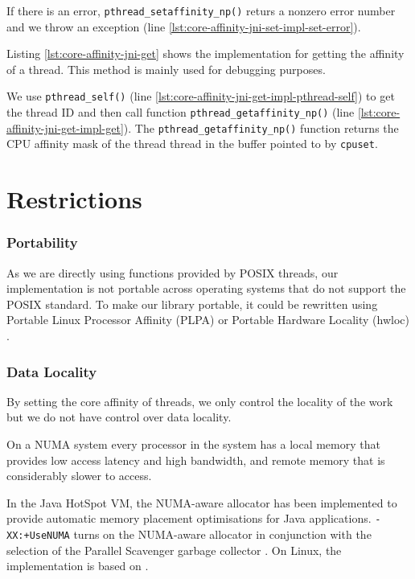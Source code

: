 If there is an error, \lstinline!pthread_setaffinity_np()! returs a
nonzero error number and we throw an exception (line
\ref{lst:core-affinity-jni-set-impl-set-error}).

Listing \ref{lst:core-affinity-jni-get} shows the implementation for
getting the affinity of a thread. This method is mainly used for
debugging purposes.

We use \lstinline!pthread_self()! (line
\ref{lst:core-affinity-jni-get-impl-pthread-self}) to get the thread
ID and then call function \lstinline!pthread_getaffinity_np()!  (line
\ref{lst:core-affinity-jni-get-impl-get}). The
\lstinline!pthread_getaffinity_np()! function returns the CPU affinity
mask of the thread thread in the buffer pointed to by
\lstinline!cpuset!.




\section{Restrictions}
\label{sec:appendix-core-affinity-restrictions}

\subsubsection{Portability}

As we are directly using functions provided by POSIX threads, our
implementation is not portable across operating systems that do not
support the POSIX standard. To make our library portable, it could be
rewritten using Portable Linux Processor Affinity (PLPA)
\cite{OpenMPI2010a} or Portable Hardware Locality (hwloc)
\cite{OpenMPI2010}.

\subsubsection{Data Locality}

By setting the core affinity of threads, we only control the locality
of the work but we do not have control over data locality.

On a NUMA system every processor in the system has a local memory that
provides low access latency and high bandwidth, and remote memory that
is considerably slower to access.

In the Java HotSpot VM, the NUMA-aware allocator has been implemented
to provide automatic memory placement optimisations for Java
applications. \verb!-XX:+UseNUMA! turns on the NUMA-aware allocator in
conjunction with the selection of the Parallel Scavenger garbage
collector \cite{Masamitsu2008, Oracle2010, Humble2010}. On Linux, the
implementation is based on \cite{Kleen2004}.

